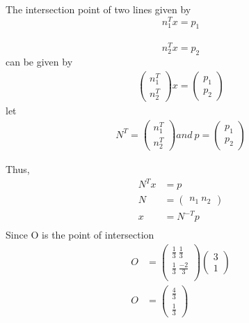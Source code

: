 \documentclass[10pt]{beamer}
\begin{document}
{
\begin{frame}
The intersection point of two lines given by \\
\[ n_{1}^{T}x = p_{1}\] \\ \[ n_{2}^{T}x = p_{2} \] can be given by \\
\begin{equation*}
\begin{split}
    \begin{pmatrix}
    n_{1}^{T} \\
    n_{2}^{T}
    \end{pmatrix}
    x = 
    \begin{pmatrix}
    p_{1} \\
    p_{2}
    \end{pmatrix}
\end{split}
\end{equation*}
let
\begin{equation*}
\begin{split}
     N^{T} = 
    \begin{pmatrix}
    n_{1}^{T} \\
    n_{2}^{T}
    \end{pmatrix}
    and\ p =
    \begin{pmatrix}
    p_{1} \\
    p_{2}
    \end{pmatrix}
\end{split}
\end{equation*}
\end{frame}
}

{
\begin{frame}
Thus,
\begin{equation*}
\begin{split}
     N^{T}x &= p \\
    N &= 
    \begin{pmatrix}
    n_{1} \
    n_{2}
    \end{pmatrix} \\
    x &= N^{-T}p \\
\end{split}
\end{equation*}
Since O is the point of intersection 
\begin{equation*}
\begin{split}
O &= 
\begin{pmatrix}
\frac{1}{3} \ \frac{1}{3} \\
\frac{1}{3} \ \frac{-2}{3} \\
\end{pmatrix}
\begin{pmatrix}
3 \\ 1
\end{pmatrix} \\
O &= \begin{pmatrix}
\frac{4}{3} \\
\frac{1}{3}
\end{pmatrix}   
\end{split}
\end{equation*}
\end{frame}
}
\end{document}
